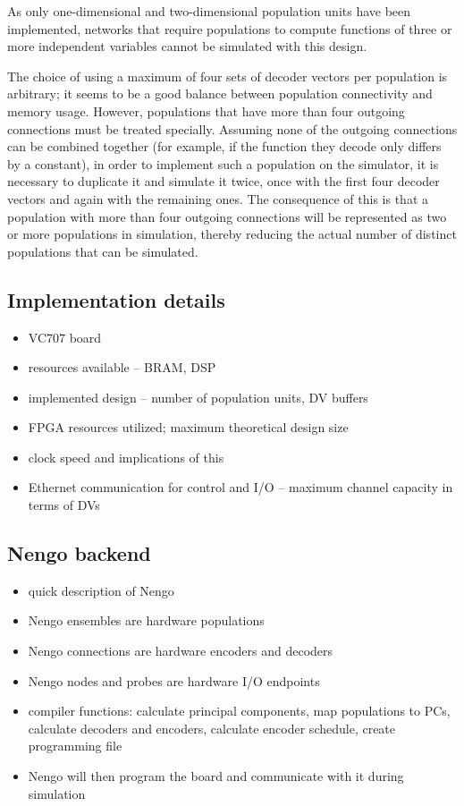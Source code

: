 \documentclass[english]{article}
\begin{document}
As only one-dimensional and two-dimensional population units have been implemented, networks that require populations to compute functions
of three or more independent variables cannot be simulated with this design.

The choice of using a maximum of four sets of decoder vectors per population is arbitrary; it seems to be a good balance between
population connectivity and memory usage. However, populations that have more than four outgoing connections must be treated specially.
Assuming none of the outgoing connections can be combined together (for example, if the function they decode only differs by a constant),
in order to implement such a population on the simulator, it is necessary to duplicate it and simulate it twice,
once with the first four decoder vectors and again with the remaining ones. The consequence of this is that a population with more than
four outgoing connections will be represented as two or more populations in simulation, thereby reducing the actual number of
distinct populations that can be simulated.

\subsection{Implementation details}

\begin{itemize}
\item VC707 board
\item resources available -- BRAM, DSP
\item implemented design -- number of population units, DV buffers
\item FPGA resources utilized; maximum theoretical design size
\item clock speed and implications of this
\item Ethernet communication for control and I/O -- maximum channel capacity in terms of DVs
\end{itemize}

\subsection{Nengo backend}

\begin{itemize}
\item quick description of Nengo
\item Nengo ensembles are hardware populations
\item Nengo connections are hardware encoders and decoders
\item Nengo nodes and probes are hardware I/O endpoints
\item compiler functions: calculate principal components, map populations to PCs, calculate decoders and encoders,
calculate encoder schedule, create programming file
\item Nengo will then program the board and communicate with it during simulation
\end{itemize}
\end{document}
